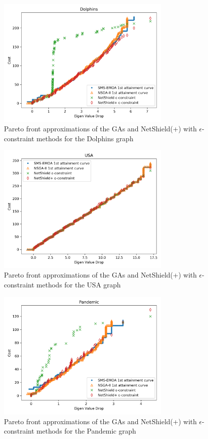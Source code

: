 \documentclass[11pt]{article}
\theoremstyle{definition}
\begin{document}
\begin{figure}[h!]
  \centering
    \includegraphics[width=0.75\textwidth]{results_ns_ga/dolphins_attaintment_netshield}
  \caption{Pareto front approximations of the GAs and NetShield(+) with $\epsilon$-constraint methods for the Dolphins graph}
  \label{fig:dolphin_atns}
\end{figure}

\begin{figure}[h!]
  \centering
    \includegraphics[width=0.75\textwidth]{results_ns_ga/USA_attaintment_netshield}
  \caption{Pareto front approximations of the GAs and NetShield(+) with $\epsilon$-constraint methods for the USA graph}
  \label{fig:USA_atns}
\end{figure}

\begin{figure}[h!]
  \centering
    \includegraphics[width=0.75\textwidth]{results_ns_ga/pandemic_attaintment_netshield}
  \caption{Pareto front approximations of the GAs and NetShield(+) with $\epsilon$-constraint methods for the Pandemic graph}
  \label{fig:Pandemic_atns}
\end{figure}
\end{document}
